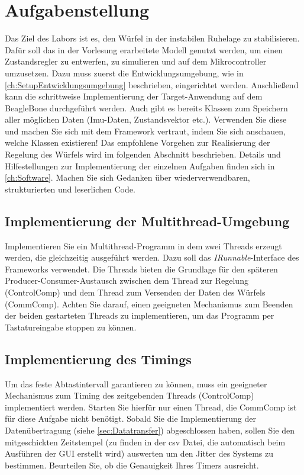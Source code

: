 \chapter{Aufgabenstellung}
    Das Ziel des Labors ist es, den Würfel in der instabilen Ruhelage zu stabilisieren. Dafür soll das in der Vorlesung erarbeitete Modell genutzt werden, um einen Zustandsregler zu entwerfen, zu simulieren und auf dem Mikrocontroller umzusetzen. Dazu muss zuerst die Entwicklungsumgebung, wie in \autoref{ch:SetupEntwicklungsumgebung} beschrieben, eingerichtet werden. Anschließend kann die schrittweise Implementierung der Target-Anwendung auf dem BeagleBone durchgeführt werden. Auch gibt es bereits Klassen zum Speichern aller möglichen Daten (Imu-Daten, Zustandsvektor etc.). Verwenden Sie diese und machen Sie sich mit dem Framework vertraut, indem Sie sich anschauen, welche Klassen existieren! Das empfohlene Vorgehen zur Realisierung der Regelung des Würfels wird im folgenden Abschnitt beschrieben. Details und Hilfestellungen zur Implementierung der einzelnen Aufgaben finden sich in \autoref{ch:Software}. Machen Sie sich Gedanken über wiederverwendbaren, strukturierten und leserlichen Code.
    
    \section{Implementierung der Multithread-Umgebung}
        Implementieren Sie ein Multithread-Programm in dem zwei Threads erzeugt werden, die gleichzeitig ausgeführt werden. Dazu soll das \textit{IRunnable}-Interface des Frameworks verwendet. Die Threads bieten die Grundlage für den späteren Producer-Consumer-Austausch zwischen dem Thread zur Regelung (ControlComp) und dem Thread zum Versenden der Daten des Würfels (CommComp). Achten Sie darauf, einen geeigneten Mechanismus zum Beenden der beiden gestarteten Threads zu implementieren, um das Programm per Tastatureingabe stoppen zu können.

    \section{Implementierung des Timings}
        Um das feste Abtastintervall garantieren zu können, muss ein geeigneter Mechanismus zum Timing des zeitgebenden Threads (ControlComp) implementiert werden. Starten Sie hierfür nur einen Thread, die CommComp ist für diese Aufgabe nicht benötigt. Sobald Sie die Implementierung der Datenübertragung (siehe \autoref{sec:Datatransfer}) abgeschlossen haben, sollen Sie den mitgeschickten Zeitstempel (zu finden in der csv Datei, die automatisch beim Ausführen der GUI erstellt wird) auswerten um den Jitter des Systems zu bestimmen. Beurteilen Sie, ob die Genauigkeit Ihres Timers ausreicht.


